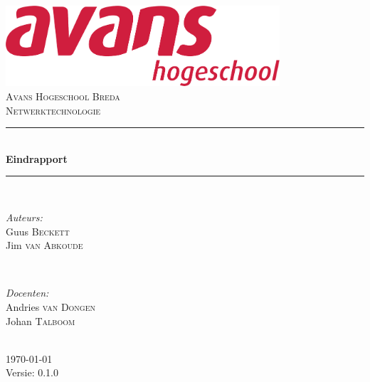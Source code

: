\documentclass[12pt]{article}
\begin{document}
\begin{titlepage}
\newcommand{\HRule}{\rule{\linewidth}{0.5mm}} %

\center %

\includegraphics[height=3cm] {avans}\\%
\textsc{\Large Avans Hogeschool Breda}\\[0.5cm] %
\textsc{\large Netwerktechnologie}\\[0.5cm] %
\HRule \\[0.4cm]
{ \huge \bfseries Eindrapport}\\[0.4cm] %
\HRule \\[1.5cm]

\begin{minipage}{0.4\textwidth}
\begin{flushleft} \large
\emph{Auteurs:}\\
Guus \textsc{Beckett} \\%
Jim \textsc{van Abkoude}
\end{flushleft}
\end{minipage}
~
\begin{minipage}{0.4\textwidth}
\begin{flushright} \large
\emph{Docenten:} \\
Andries \textsc{van Dongen} \\ %
Johan \textsc{Talboom}
\end{flushright}
\end{minipage}\\[4cm]

{\large \today}\\[3cm] %

Versie: 0.1.0

\vfill %

\end{titlepage}
\end{document}
